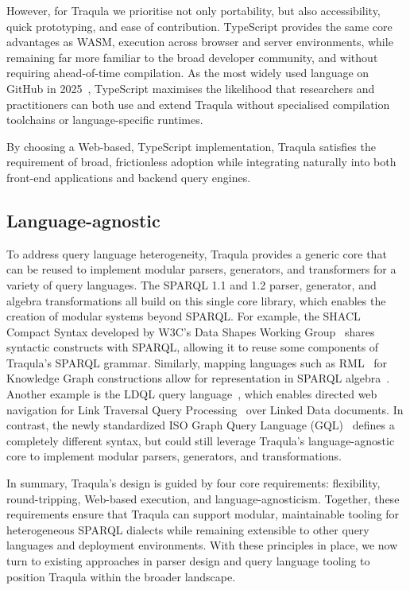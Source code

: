 \documentclass[runningheads]{llncs}
\begin{document}
    However, for Traqula we prioritise not only portability, but also accessibility, quick prototyping, and ease of contribution.
    TypeScript provides the same core advantages as WASM, execution across browser and server environments,
    while remaining far more familiar to the broad developer community,
    and without requiring ahead-of-time compilation.
    As the most widely used language on GitHub in 2025~\cite{github:lang-use},
    TypeScript maximises the likelihood that researchers and practitioners can both use and extend Traqula without specialised compilation toolchains or language-specific runtimes.

    By choosing a Web-based, TypeScript implementation, Traqula satisfies the requirement of broad,
    frictionless adoption while integrating naturally into both front-end applications and backend query engines.

    \subsection{Language-agnostic}

    To address query language heterogeneity, Traqula provides a generic core that can be reused to implement modular parsers,
    generators, and transformers for a variety of query languages.
    The SPARQL 1.1 and 1.2 parser, generator, and algebra transformations all build on this single core library,
    which enables the creation of modular systems beyond SPARQL.
    For example, the SHACL Compact Syntax developed by W3C's Data Shapes Working Group~\cite{shacl-1-2-cs}
    shares syntactic constructs with SPARQL, allowing it to reuse some components of Traqula's SPARQL grammar.
    Similarly, mapping languages such as RML~\cite{rml} for Knowledge Graph constructions allow for representation in SPARQL algebra~\cite{minoo_swj_algebraicmappingoperators}.
    Another example is the LDQL query language~\cite{ldql},
    which enables directed web navigation for Link Traversal Query Processing~\cite{linktraversalfoundations,solidquery} over Linked Data documents.
    In contrast, the newly standardized ISO Graph Query Language (GQL)~\cite{iso-gql} defines a completely different syntax,
    but could still leverage Traqula's language-agnostic core to implement modular parsers,
    generators, and transformations.

    In summary, Traqula's design is guided by four core requirements:
    flexibility, round-tripping, Web-based execution, and language-agnosticism.
    Together, these requirements ensure that Traqula can support modular,
    maintainable tooling for heterogeneous SPARQL dialects while remaining extensible to other query languages and deployment environments.
    With these principles in place, we now turn to existing approaches in parser design and query language tooling to position Traqula within the broader landscape.
\end{document}
